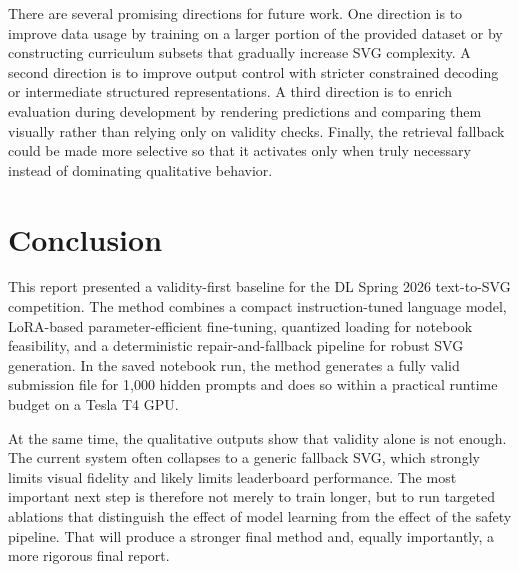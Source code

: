 \documentclass[11pt]{article}
\begin{document}
There are several promising directions for future work. One direction is to improve data usage by training on a larger portion of the provided dataset or by constructing curriculum subsets that gradually increase SVG complexity. A second direction is to improve output control with stricter constrained decoding or intermediate structured representations. A third direction is to enrich evaluation during development by rendering predictions and comparing them visually rather than relying only on validity checks. Finally, the retrieval fallback could be made more selective so that it activates only when truly necessary instead of dominating qualitative behavior.

\section{Conclusion}
This report presented a validity-first baseline for the DL Spring 2026 text-to-SVG competition. The method combines a compact instruction-tuned language model, LoRA-based parameter-efficient fine-tuning, quantized loading for notebook feasibility, and a deterministic repair-and-fallback pipeline for robust SVG generation. In the saved notebook run, the method generates a fully valid submission file for 1,000 hidden prompts and does so within a practical runtime budget on a Tesla T4 GPU.

At the same time, the qualitative outputs show that validity alone is not enough. The current system often collapses to a generic fallback SVG, which strongly limits visual fidelity and likely limits leaderboard performance. The most important next step is therefore not merely to train longer, but to run targeted ablations that distinguish the effect of model learning from the effect of the safety pipeline. That will produce a stronger final method and, equally importantly, a more rigorous final report.



\end{document}
